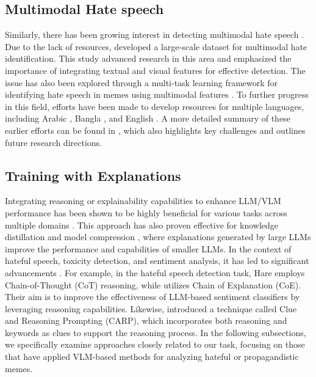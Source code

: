 \subsection{Multimodal Hate speech}
Similarly, there has been growing interest in detecting multimodal hate speech \cite{kiela2020hateful, velioglu2020detecting, hee2022explaining}. Due to the lack of resources, \citet{kiela2020hateful} developed a large-scale dataset for multimodal hate identification. This study advanced research in this area and emphasized the importance of integrating textual and visual features for effective detection.
The issue has also been explored through a multi-task learning framework for identifying hate speech in memes using multimodal features \cite{ijcai2022p781}. To further progress in this field, efforts have been made to develop resources for multiple languages, including Arabic \cite{alam2024propaganda}, Bangla \cite{hossain-etal-2022-mute}, and English \cite{hee2023decoding}. A more detailed summary of these earlier efforts can be found in \citet{ijcai2022p781}, which also highlights key challenges and outlines future research directions.


\subsection{Training with Explanations}
Integrating reasoning or explainability capabilities to enhance LLM/VLM performance has been shown to be highly beneficial for various tasks across multiple domains \cite{plaat2024reasoning}. This approach has also proven effective for knowledge distillation and model compression \cite{li2022explanations, magister2022teaching}, where explanations generated by large LLMs improve the performance and capabilities of smaller LLMs. In the context of hateful speech, toxicity detection, and sentiment analysis, it has led to significant advancements \cite{yang2023hare, huang_chain_2023, sun_text_2023}.
%
For example, in the hateful speech detection task, Hare \cite{yang2023hare} employs Chain-of-Thought (CoT) reasoning, while \cite{huang_chain_2023} utilizes Chain of Explanation (CoE). Their aim is to improve the effectiveness of LLM-based sentiment classifiers by leveraging reasoning capabilities. Likewise, \citet{sun_text_2023} introduced a technique called Clue and Reasoning Prompting (CARP), which incorporates both reasoning and keywords as clues to support the reasoning process. 
%
In the following subsections, we specifically examine approaches closely related to our task, focusing on those that have applied VLM-based methods for analyzing hateful or propagandistic memes.
%

